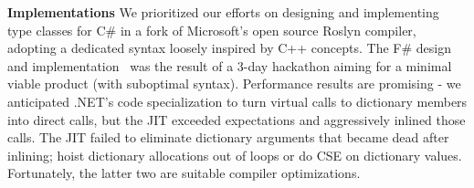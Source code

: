\documentclass[9pt]{sig-alternate-05-2015}
\begin{document}
{\bf Implementations} We prioritized our efforts on designing and implementing type classes for C\# in a fork\cite{Roslynfork}  of  Microsoft's open source Roslyn compiler\cite{Roslyn}, adopting a dedicated syntax loosely inspired  by C++ concepts\cite{cppconcepts}.
The F\# design and implementation~\cite{fshack} was the result of a 3-day hackathon aiming for a minimal viable product (with suboptimal syntax).
Performance results are promising - we anticipated  .NET's code specialization to turn virtual calls to dictionary members into direct calls, but the JIT exceeded expectations and aggressively inlined those calls. 
The JIT failed to eliminate  dictionary arguments that became dead after inlining; hoist dictionary allocations out of loops or do CSE on dictionary values. Fortunately, the latter two are suitable compiler optimizations.
\vspace{-1em}
\small


 
\end{document}
